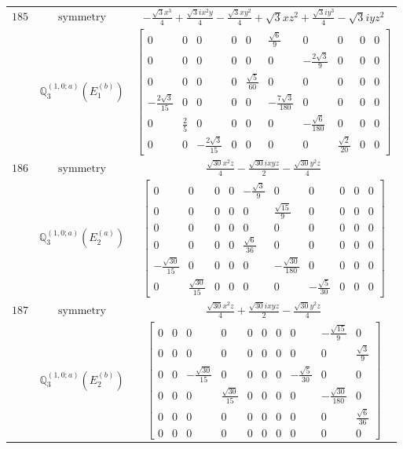 \documentclass[fleqn,8pt,landscape]{jsarticle}
\begin{document}
\begin{longtable}{ccc}
$ 185 $ & $ \text{symmetry} $ & $ - \frac{\sqrt{3} x^{3}}{4} + \frac{\sqrt{3} i x^{2} y}{4} - \frac{\sqrt{3} x y^{2}}{4} + \sqrt{3} x z^{2} + \frac{\sqrt{3} i y^{3}}{4} - \sqrt{3} i y z^{2} $ \\
$  $ & $ \mathbb{Q}_{3}^{(1,0;a)}(E_{1}^{(b)}) $ & $ \begin{bmatrix} 0 & 0 & 0 & 0 & 0 & \frac{\sqrt{6}}{9} & 0 & 0 & 0 & 0 \\ 0 & 0 & 0 & 0 & 0 & 0 & - \frac{2 \sqrt{3}}{9} & 0 & 0 & 0 \\ 0 & 0 & 0 & 0 & \frac{\sqrt{5}}{60} & 0 & 0 & 0 & 0 & 0 \\ - \frac{2 \sqrt{3}}{15} & 0 & 0 & 0 & 0 & - \frac{7 \sqrt{3}}{180} & 0 & 0 & 0 & 0 \\ 0 & \frac{2}{5} & 0 & 0 & 0 & 0 & - \frac{\sqrt{6}}{180} & 0 & 0 & 0 \\ 0 & 0 & - \frac{2 \sqrt{3}}{15} & 0 & 0 & 0 & 0 & \frac{\sqrt{2}}{20} & 0 & 0 \end{bmatrix} $ \\ \hline
$ 186 $ & $ \text{symmetry} $ & $ \frac{\sqrt{30} x^{2} z}{4} - \frac{\sqrt{30} i x y z}{2} - \frac{\sqrt{30} y^{2} z}{4} $ \\
$  $ & $ \mathbb{Q}_{3}^{(1,0;a)}(E_{2}^{(a)}) $ & $ \begin{bmatrix} 0 & 0 & 0 & 0 & - \frac{\sqrt{3}}{9} & 0 & 0 & 0 & 0 & 0 \\ 0 & 0 & 0 & 0 & 0 & \frac{\sqrt{15}}{9} & 0 & 0 & 0 & 0 \\ 0 & 0 & 0 & 0 & 0 & 0 & 0 & 0 & 0 & 0 \\ 0 & 0 & 0 & 0 & \frac{\sqrt{6}}{36} & 0 & 0 & 0 & 0 & 0 \\ - \frac{\sqrt{30}}{15} & 0 & 0 & 0 & 0 & - \frac{\sqrt{30}}{180} & 0 & 0 & 0 & 0 \\ 0 & \frac{\sqrt{30}}{15} & 0 & 0 & 0 & 0 & - \frac{\sqrt{5}}{30} & 0 & 0 & 0 \end{bmatrix} $ \\ \hline
$ 187 $ & $ \text{symmetry} $ & $ \frac{\sqrt{30} x^{2} z}{4} + \frac{\sqrt{30} i x y z}{2} - \frac{\sqrt{30} y^{2} z}{4} $ \\
$  $ & $ \mathbb{Q}_{3}^{(1,0;a)}(E_{2}^{(b)}) $ & $ \begin{bmatrix} 0 & 0 & 0 & 0 & 0 & 0 & 0 & 0 & - \frac{\sqrt{15}}{9} & 0 \\ 0 & 0 & 0 & 0 & 0 & 0 & 0 & 0 & 0 & \frac{\sqrt{3}}{9} \\ 0 & 0 & - \frac{\sqrt{30}}{15} & 0 & 0 & 0 & 0 & - \frac{\sqrt{5}}{30} & 0 & 0 \\ 0 & 0 & 0 & \frac{\sqrt{30}}{15} & 0 & 0 & 0 & 0 & - \frac{\sqrt{30}}{180} & 0 \\ 0 & 0 & 0 & 0 & 0 & 0 & 0 & 0 & 0 & \frac{\sqrt{6}}{36} \\ 0 & 0 & 0 & 0 & 0 & 0 & 0 & 0 & 0 & 0 \end{bmatrix} $ \\ \hline

\end{longtable}
\end{document}
